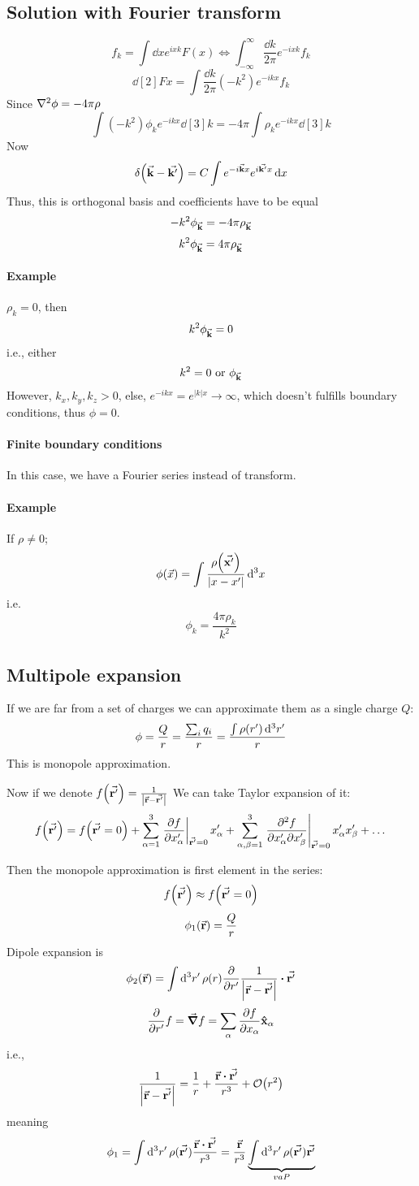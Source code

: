 \subsection{Solution with Fourier transform}
$$f_k = \int \dd{x} e^{ixk} F(x) \iff \int_{-\infty}^\infty \frac{\dd{k}}{2\pi} e^{-ixk} f_k $$
$$\dd[2]{F}{x} = \int  \frac{\dd{k}}{2\pi} (-k^2) e^{-ikx}  f_k$$
Since $\laplacian{\phi} = -4\pi \rho$
$$\int (-k^2) \phi_k e^{-ikx} \dd[3]{k} = -4\pi \int \rho_k e^{-ikx} \dd[3]{k}$$
Now
$$\delta\qty(\va{k} - \va{k'}) = C\int e^{-i \va{k} x} e^{i\va{k'} x} \dd{x}$$
Thus, this is orthogonal basis and coefficients have to be equal
$$-k^2 \phi_{\va{k}} = -4\pi \rho_{\va{k}}$$
$$k^2 \phi_{\va{k}} = 4\pi \rho_{\va{k}}$$
\paragraph{Example}
$\rho_k = 0$, then
$$k^2 \phi_{\va{k}} = 0$$
i.e., either $$k^2 =0 \text{ or } \phi_{\va{k}}$$
However, $k_x, k_y, k_z > 0$, else, $e^{-ikx} = e^{|k|x} \to \infty$, which doesn't fulfills boundary conditions, thus $\phi = 0$.
\paragraph{Finite boundary conditions}
In this case, we have a Fourier series instead of transform.
\paragraph{Example}
If $\rho \neq 0$;
$$\phi (\vec{x}) = \int \frac{\rho\qty(\va{x'})}{\qty|x-x'|} \dd[3]{x}$$
i.e.
$$\phi_k = \frac{4\pi \rho_k}{k^2}$$

\subsection{Multipole expansion}
If we are far from a set of charges we can approximate them as a single charge $Q$:
$$\phi = \frac{Q}{r} = \frac{\sum_i q_i}{r} = \frac{\int \rho\qty(r') \dd[3]{r'}}{r}$$
This is monopole approximation.

Now if we denote $f\qty(\va{r'}) = \frac{1}{\qty|\va{r} -\va{r'}|}$
We can take Taylor expansion of it:
$$f\qty(\va{r'}) = f\qty(\va{r'} = 0)  + \sum_{\alpha=1}^{3} \eval{\pdv{f}{x'_\alpha}}_{\va{r'} =0} x'_\alpha + \sum_{\alpha, \beta = 1}^{3} \eval{\pdv{f}{x'_\alpha}{x'_\beta}}_{\va{r'} =0} x'_\alpha x'_\beta+ \dots$$

Then the monopole approximation is first element in the series:
$$f\qty(\va{r'}) \approx f\qty(\va{r'} = 0)$$
$$\phi_1\qty(\va{r}) = \frac{Q}{r}$$
Dipole expansion is
$$\phi_2\qty(\va{r}) = \int \dd[3]{r'} \rho(r) \pdv{r'} \frac{1}{\qty|\va{r}-\va{r'}|} \vdot \va{r'} $$
$$\pdv{r'} f = \grad{f} = \sum_{\alpha}  \pdv{f}{x_\alpha} \vu{x}_\alpha$$
i.e.,
$$\frac{1}{\qty|\va{r}-\va{r'}|} = \frac{1}{r} + \frac{\va{r} \vdot \va{r'}}{r^3} + \order{r^2}$$
meaning
$$\phi_1 = \int \dd[3]{r'} \rho(\va{r'}) \frac{\va{r} \vdot \va{r'}}{r^3}  =  \frac{\va{r}}{r^3} \underbrace{ \int \dd[3]{r'} \rho(\va{r'}) \va{r'} }_{va{P}}$$
